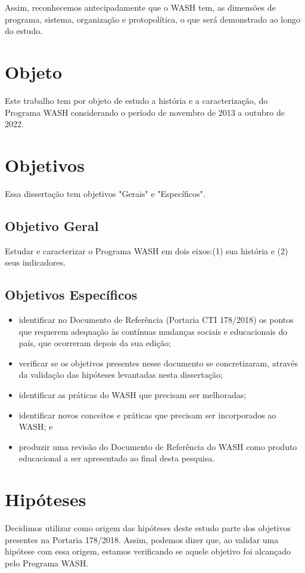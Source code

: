 Assim, reconhecemos antecipadamente que o WASH tem, as dimensões de programa, sistema, organização e protopolítica, o que será demonstrado ao longo do estudo.

\section[Objeto]{Objeto}\label{Objeto}
Este trabalho tem por objeto de estudo a história e a caracterização, do Programa WASH considerando o período de novembro de 2013 a outubro de 2022.

\section[Objetivos]{Objetivos}\label{Objetivos}
Essa dissertação tem objetivos  "Gerais" e "Específicos".

\subsection[Objetivo Geral]{Objetivo Geral}\label{Objetivo Geral}
Estudar e caracterizar o Programa WASH em dois eixos:(1) sua história e (2) seus indicadores.

\subsection[Objetivos Específicos]{Objetivos Específicos}\label{Objetivos Específicos}



\begin{itemize}
\item identificar no Documento de Referência (Portaria CTI 178/2018) os pontos que requerem adequação às contínuas mudanças sociais e educacionais do país, que ocorreram depois da sua edição;
\item verificar se os objetivos presentes nesse documento se concretizaram, através da validação das hipóteses levantadas nesta dissertação;
\item identificar as práticas do WASH que precisam ser melhoradas;
\item identificar novos conceitos e práticas que precisam ser incorporados ao WASH; e
\item produzir uma revisão do Documento de Referência do WASH como produto educacional a ser apresentado ao final desta pesquisa.
\end{itemize}

\section[Hipóteses]{Hipóteses}\label{Hipóteses}
Decidimos utilizar como origem das hipóteses deste estudo parte dos objetivos presentes na Portaria 178/2018. Assim, podemos dizer que, ao validar uma hipótese com essa origem, estamos verificando se aquele objetivo foi alcançado pelo Programa WASH.

